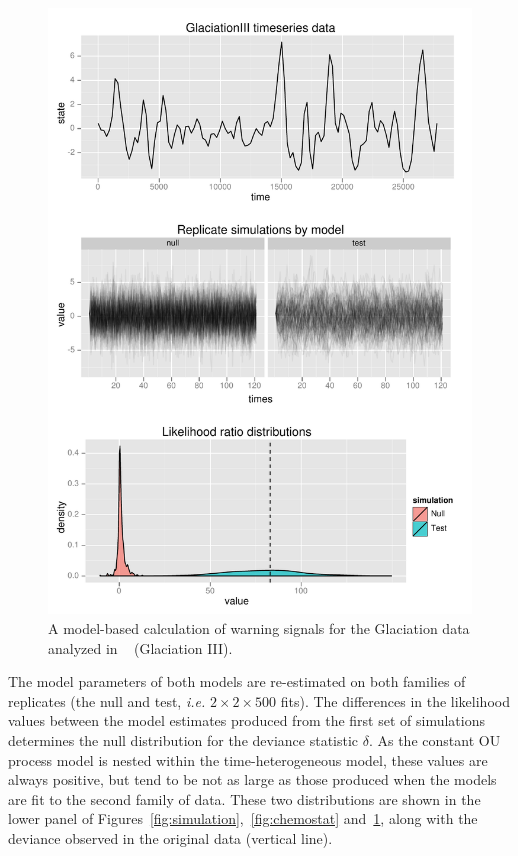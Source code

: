 \documentclass[authoryear,review,11pt]{elsarticle}
\begin{document}
 \begin{figure}
   \begin{center}
     \includegraphics[width=.85\linewidth]{figures/GlaciationIII_warningsignal.pdf}
     \caption{A model-based calculation of warning signals for the Glaciation data analyzed in ~\citet{Dakos2008} (Glaciation III).}
     \label{fig:glaciation}
  \end{center}
 \end{figure}


The model parameters of both models are re-estimated on both families of replicates 
(the null and test, \emph{i.e.} $2 \times 2 \times 500$ fits). 
The differences in the likelihood values between the model estimates produced from the first set of simulations 
determines the null distribution for the deviance statistic $\delta$.  
As the constant OU process model is nested within the time-heterogeneous model, these values are always positive,
but tend to be not as large as those produced when the models are fit to the second family of data. 
These two distributions are shown in the lower panel of 
Figures~\ref{fig:simulation},~\ref{fig:chemostat} and~\ref{fig:glaciation}, 
along with the deviance observed in the original data (vertical line).
\end{document}
